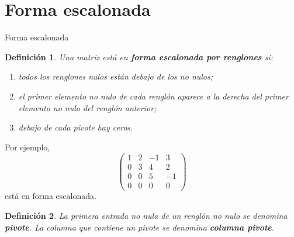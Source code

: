\documentclass[aspectratio=169,9pt]{beamer}
\newtheorem{definicion}{Definición}[section]
\theoremstyle{remark}
\begin{document}
\section{Forma escalonada}
\begin{frame}[allowframebreaks,t]{Forma escalonada}
\begin{definicion}
Una matriz está en \textbf{forma escalonada por renglones} si:
\begin{enumerate}
\item todos los renglones nulos están debajo de los no nulos;
\item el primer elemento no nulo de cada renglón aparece a la derecha del primer elemento no nulo
del renglón anterior;
\item debajo de cada pivote hay ceros.
\end{enumerate}
\end{definicion}

Por ejemplo,
\[
\begin{pmatrix}
1&2&-1&3\\
0&3&4&2\\
0&0&5&-1\\
0&0&0&0
\end{pmatrix}
\]
está en forma escalonada.

\begin{definicion}
La primera entrada no nula de un renglón no nulo se denomina \textbf{pivote}. La columna que contiene
un pivote se denomina \textbf{columna pivote}.
\end{definicion}
\end{frame}
\end{document}
